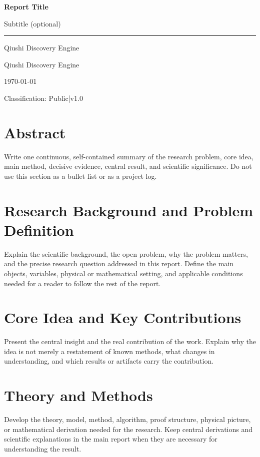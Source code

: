\documentclass[11pt,a4paper]{article}
\providecommand{\ReportTitle}{Report Title}
\providecommand{\ReportSubtitle}{Subtitle (optional)}
\providecommand{\ReportAuthor}{Qiushi Discovery Engine}
\providecommand{\ReportOrganization}{Qiushi Discovery Engine}
\providecommand{\ReportClassification}{Public}
\providecommand{\ReportVersion}{v1.0}
\providecommand{\ReportDate}{\today}
\providecommand{\MakeReportCover}{%
  \begin{titlepage}
  \pagecolor{ReportPrimary}\afterpage{\nopagecolor}
  \color{white}
  \vspace*{2.5cm}
  \begin{flushleft}
    {\Huge\bfseries \ReportTitle\par}\vspace{0.6cm}
    {\Large\color{ReportLight}\ReportSubtitle\par}\vspace{1.5cm}
    {\color{ReportLight}\rule{6cm}{0.6pt}}
  \end{flushleft}
  \vfill
  \begin{flushleft}
    {\large \ReportAuthor\par}\vspace{0.2cm}
    {\normalsize\color{ReportLight}\ReportOrganization\par}\vspace{0.6cm}
    {\normalsize\color{ReportLight}\ReportDate\par}\vspace{0.4cm}
    {\small\color{ReportLight}Classification: \ReportClassification\quad|\quad\ReportVersion\par}
  \end{flushleft}
  \end{titlepage}}
\begin{document}
\hypersetup{pageanchor=false}
\MakeReportCover
\hypersetup{pageanchor=true}
\setcounter{page}{1}

\thispagestyle{plain}
\tableofcontents
\newpage

\section*{Abstract}

Write one continuous, self-contained summary of the research problem, core idea,
main method, decisive evidence, central result, and scientific significance. Do
not use this section as a bullet list or as a project log.

\newpage

\section{Research Background and Problem Definition}

Explain the scientific background, the open problem, why the problem matters,
and the precise research question addressed in this report. Define the main
objects, variables, physical or mathematical setting, and applicable conditions
needed for a reader to follow the rest of the report.

\section{Core Idea and Key Contributions}

Present the central insight and the real contribution of the work. Explain why
the idea is not merely a restatement of known methods, what changes in
understanding, and which results or artifacts carry the contribution.

\section{Theory and Methods}

Develop the theory, model, method, algorithm, proof structure, physical picture,
or mathematical derivation needed for the research. Keep central derivations and
scientific explanations in the main report when they are necessary for
understanding the result.

\end{document}
